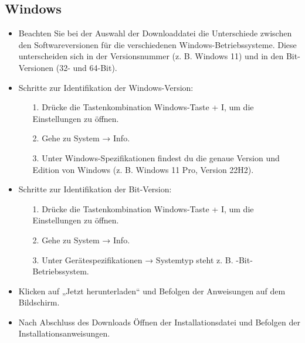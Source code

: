 \subsection*{Windows}
\begin{itemize}
	\item Beachten Sie bei der Auswahl der Downloaddatei die Unterschiede zwischen den Softwareversionen für die verschiedenen Windows-Betriebssysteme. Diese unterscheiden sich in der Versionsnummer (z. B. \glqq Windows 11\grqq {}) und in den Bit-Versionen (32- und 64-Bit).
	\item Schritte zur Identifikation der Windows-Version:
		\begin{itemize}
		\item[1.] Drücke die Tastenkombination Windows-Taste + I, um die Einstellungen zu öffnen.
		\item[2.] Gehe zu System → Info.
		\item[3.] Unter Windows-Spezifikationen findest du die genaue Version und Edition von Windows (z. B. \glqq Windows 11 Pro\grqq {}, \glqq Version 22H2\grqq {}).
		\end{itemize}
	\item Schritte zur Identifikation der Bit-Version:
		\begin{itemize}
		\item[1.] Drücke die Tastenkombination Windows-Taste + I, um die Einstellungen zu öffnen.
		\item[2.] Gehe zu System → Info.
		\item[3.] 	Unter Gerätespezifikationen → Systemtyp steht z. B. -Bit-Betriebssystem\grqq {}.
		\end{itemize}
	\item Klicken auf „Jetzt herunterladen“ und Befolgen der Anweisungen auf dem Bildschirm.
	\item Nach Abschluss des Downloads Öffnen der Installationsdatei und Befolgen der Installationsanweisungen.
\end{itemize}
